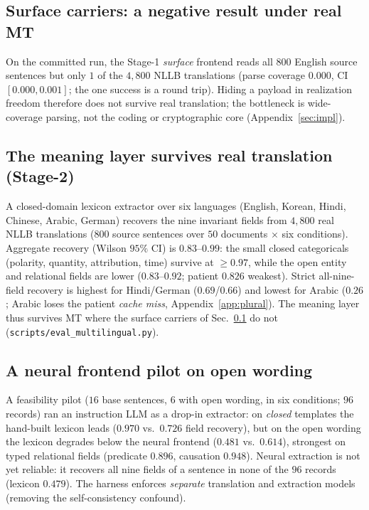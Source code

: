 \documentclass[11pt]{article}
\begin{document}
\subsection{Surface carriers: a negative result under real MT}
\label{sec:realmt}
On the committed run, the Stage-1 \emph{surface} frontend reads all $800$ English source sentences but only $1$ of the $4{,}800$ NLLB translations (parse coverage $0.000$, CI $[0.000,0.001]$; the one success is a round trip). Hiding a payload in realization freedom therefore does not survive real translation; the bottleneck is wide-coverage parsing, not the coding or cryptographic core (Appendix~\ref{sec:impl}).

\subsection{The meaning layer survives real translation (Stage-2)}
\label{sec:stage2}
A closed-domain lexicon extractor over six languages (English, Korean, Hindi, Chinese, Arabic, German) recovers the nine invariant fields from $4{,}800$ real NLLB translations ($800$ source sentences over $50$ documents $\times$ six conditions). Aggregate recovery (Wilson $95\%$ CI) is $0.83$--$0.99$: the small closed categoricals (polarity, quantity, attribution, time) survive at $\ge0.97$, while the open entity and relational fields are lower ($0.83$--$0.92$; patient $0.826$ weakest). Strict all-nine-field recovery is highest for Hindi/German ($0.69$/$0.66$) and lowest for Arabic ($0.26$; Arabic loses the patient \emph{cache miss}, Appendix~\ref{app:plural}). The meaning layer thus survives MT where the surface carriers of Sec.~\ref{sec:realmt} do not (\texttt{scripts/\allowbreak eval\_multilingual.py}).

\subsection{A neural frontend pilot on open wording}
\label{sec:neural}
A feasibility pilot ($16$ base sentences, $6$ with open wording, in six conditions; $96$ records) ran an instruction LLM as a drop-in extractor: on \emph{closed} templates the hand-built lexicon leads ($0.970$ vs.\ $0.726$ field recovery), but on the open wording the lexicon degrades below the neural frontend ($0.481$ vs.\ $0.614$), strongest on typed relational fields (predicate $0.896$, causation $0.948$). Neural extraction is not yet reliable: it recovers all nine fields of a sentence in none of the $96$ records (lexicon $0.479$). The harness enforces \emph{separate} translation and extraction models (removing the self-consistency confound).
\end{document}
